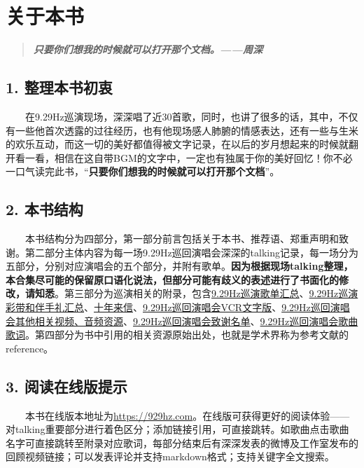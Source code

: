 \documentclass[]{ctexbook}
\begin{document}
\section*{关于本书}\label{about-book}


\begin{quote}
\textbf{\emph{只要你们想我的时候就可以打开那个文档。------周深}}
\end{quote}

\subsection*{1. 整理本书初衷}\label{motivation}


  在9.29Hz巡演现场，深深唱了近30首歌，同时，也讲了很多的话，其中，不仅有一些他首次透露的过往经历，也有他现场感人肺腑的情感表达，还有一些与生米的欢乐互动，而这一切的美好都值得被文字记录，在以后的岁月想起来的时候就翻开看一看，相信在这自带BGM的文字中，一定也有独属于你的美好回忆！你不必一口气读完此书，``\textbf{只要你们想我的时候就可以打开那个文档}''。

\subsection*{2. 本书结构}\label{book-structure}


  本书结构分为四部分，第一部分前言包括关于本书、推荐语、郑重声明和致谢。第二部分主体内容为每一场9.29Hz巡回演唱会深深的talking记录，每一场分为五部分，分别对应演唱会的五个部分，并附有歌单。\textbf{因为根据现场talking整理，本合集尽可能的保留原口语化说法，但部分可能有歧义的表述进行了书面化的修改，请知悉}。第三部分为巡演相关的附录，包含\hyperref[playlists]{9.29Hz巡演歌单汇总}、\hyperref[appendix-gift]{9.29Hz巡演彩带和伴手礼汇总}、\hyperref[appendix-letter]{十年来信}、\hyperref[appendix-vcr]{9.29Hz巡回演唱会VCR文字版}、\hyperref[related-929hz]{9.29Hz巡回演唱会其他相关视频、音频资源}、\hyperref[acknowledgements-list]{9.29Hz巡回演唱会致谢名单}、\hyperref[appendix-song-lyric]{9.29Hz巡回演唱会歌曲歌词}。第四部分为书中引用的相关资源原始出处，也就是学术界称为参考文献的reference。

\subsection*{3. 阅读在线版提示}\label{tips}


  本书在线版本地址为\url{https://929hz.com}。在线版可获得更好的阅读体验------对talking重要部分进行着色区分；添加链接引用，可直接跳转。如歌曲点击歌曲名字可直接跳转至附录对应歌词，每部分结束后有深深发表的微博及工作室发布的回顾视频链接；可以发表评论并支持markdown格式；支持关键字全文搜索。
\end{document}

